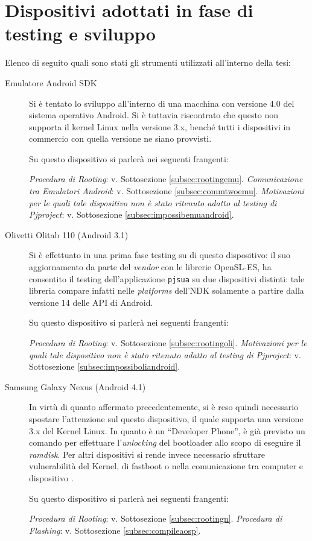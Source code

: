 \section{Dispositivi adottati in fase di testing e sviluppo}
Elenco di seguito quali sono stati gli strumenti utilizzati all'interno della
tesi:
\begin{description}
\item[Emulatore Android SDK] Si è tentato lo sviluppo all'interno di una macchina
	con versione 4.0 del sistema operativo Android. Si è tuttavia riscontrato
	che questo non supporta il kernel Linux nella versione 3.x, benché tutti
	i dispositivi in commercio con quella versione ne siano provvisti.
	
	Su questo dispositivo si parlerà nei seguenti frangenti:
	\begin{itemize}
	\diam \textit{Procedura di Rooting}: v. Sottosezione \vref{subsec:rootingemu}.
	\diam \textit{Comunicazione tra Emulatori Android}: v. Sottosezione \vref{subsec:commtwoemu}.
	\diam \textit{Motivazioni per le quali tale dispositivo non è stato ritenuto
	      adatto al testing di Pjproject}: v. Sottosezione \vref{subsec:impossibemuandroid}.
	\end{itemize}
	
\item[Olivetti Olitab 110 (Android 3.1)] Si è effettuato in una prima fase 
	testing su di questo dispositivo: il suo aggiornamento 
	da parte del \textit{vendor} con le librerie OpenSL-ES, ha consentito
	il testing dell'applicazione \texttt{pjsua} su due dispositivi distinti:
	tale libreria compare infatti nelle \textit{platforms} dell'NDK solamente
	a partire dalla versione 14 delle API di Android. 

	Su questo dispositivo si parlerà nei seguenti frangenti:
	\begin{itemize}
	\diam \textit{Procedura di Rooting}: v. Sottosezione \vref{subsec:rootingoli}.
	\diam \textit{Motivazioni per le quali tale dispositivo non è stato ritenuto
	      adatto al testing di Pjproject}: v. Sottosezione \vref{subsec:impossiboliandroid}.
	\end{itemize}

\item[Samsung Galaxy Nexus (Android 4.1)] In virtù di quanto affermato precedentemente, si è 
	reso quindi necessario spostare	l'attenzione sul questo dispositivo, il
	quale supporta una versione 3.x del Kernel Linux. In quanto è un
	``Developer Phone'', è già previsto un comando per effettuare l'\textit{unlocking}
	del bootloader allo scopo di eseguire il \textit{ramdisk}. Per altri dispositivi
	si rende invece necessario sfruttare vulnerabilità del Kernel, di 
	fastboot o nella comunicazione tra computer e dispositivo \parencite{tesi:nexus}.
	
	Su questo dispositivo si parlerà nei seguenti frangenti:
	\begin{itemize}
	\diam \textit{Procedura di Rooting}: v. Sottosezione \vref{subsec:rootingn}.
	\diam \textit{Procedura di Flashing}: v. Sottosezione \vref{subsec:compileaosp}.
	\end{itemize}
\end{description}

